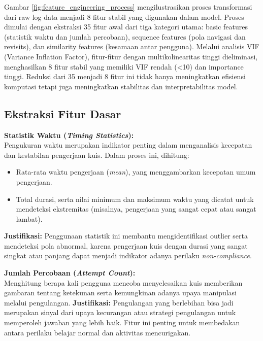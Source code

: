 Gambar \ref{fig:feature_engineering_process} mengilustrasikan proses transformasi dari raw log data menjadi 8 fitur stabil yang digunakan dalam model. Proses dimulai dengan ekstraksi 35 fitur awal dari tiga kategori utama: basic features (statistik waktu dan jumlah percobaan), sequence features (pola navigasi dan revisits), dan similarity features (kesamaan antar pengguna). Melalui analisis VIF (Variance Inflation Factor), fitur-fitur dengan multikolinearitas tinggi dieliminasi, menghasilkan 8 fitur stabil yang memiliki VIF rendah (<10) dan importance tinggi. Reduksi dari 35 menjadi 8 fitur ini tidak hanya meningkatkan efisiensi komputasi tetapi juga meningkatkan stabilitas dan interpretabilitas model.

\subsection{Ekstraksi Fitur Dasar}
\label{sec:ekstraksiFiturDasar}
\textbf{Statistik Waktu (\textit{Timing Statistics}):} \\
Pengukuran waktu merupakan indikator penting dalam menganalisis kecepatan dan kestabilan pengerjaan kuis. Dalam proses ini, dihitung:
\begin{itemize}
    \item Rata-rata waktu pengerjaan (\textit{mean}), yang menggambarkan kecepatan umum pengerjaan.
    \item Total durasi, serta nilai minimum dan maksimum waktu yang dicatat untuk mendeteksi ekstremitas (misalnya, pengerjaan yang sangat cepat atau sangat lambat).
\end{itemize}
\textbf{Justifikasi:} Penggunaan statistik ini membantu mengidentifikasi outlier serta mendeteksi pola abnormal, karena pengerjaan kuis dengan durasi yang sangat singkat atau panjang dapat menjadi indikator adanya perilaku \textit{non-compliance}.

\textbf{Jumlah Percobaan (\textit{Attempt Count}):} \\
Menghitung berapa kali pengguna mencoba menyelesaikan kuis memberikan gambaran tentang ketekunan serta kemungkinan adanya upaya manipulasi melalui pengulangan.
\textbf{Justifikasi:} Pengulangan yang berlebihan bisa jadi merupakan sinyal dari upaya kecurangan atau strategi pengulangan untuk memperoleh jawaban yang lebih baik. Fitur ini penting untuk membedakan antara perilaku belajar normal dan aktivitas mencurigakan.

